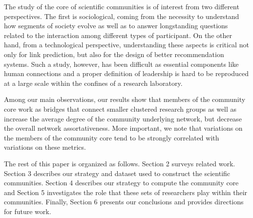 The study of the core of scientific communities is of interest from two different perspectives.  The first is sociological, coming from the necessity to understand how
segments of society evolve as well as to answer longstanding  questions related to the interaction among different types of participant. On the other hand, from a technological perspective,
understanding these aspects is critical not only for link prediction, but also for the design of better recommendation systems. 
Such a study, however, has been difficult as essential components like human connections and a proper definition of leadership is hard to be
reproduced at a large scale within the confines of a research laboratory.

Among our main observations, our results show that members of the community core work as bridges that connect smaller clustered research groups as well as increase the average
degree of the community underlying network, but decrease the overall network assortativeness. More important, we note that variations on the members of the community core tend to be strongly correlated
with variations on these metrics.

The rest of this paper is organized as follows. Section 2 surveys related work. Section 3 describes our strategy and dataset used to construct the 
scientific communities.  Section 4 describes our strategy to compute the community core and Section 5 investigates the
role that these sets of researchers play within their communities.  Finally, Section 6 presents our conclusions and provides directions for future work. 




